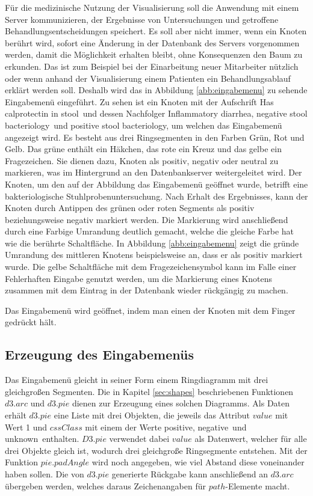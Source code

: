 Für die medizinische Nutzung der Visualisierung soll die Anwendung mit einem Server kommunizieren, der Ergebnisse von Untersuchungen und getroffene Behandlungsentscheidungen speichert. Es soll aber nicht immer, wenn ein Knoten berührt wird, sofort eine Änderung in der Datenbank des Servers vorgenommen werden, damit die Möglichkeit erhalten bleibt, ohne Konsequenzen den Baum zu erkunden. Das ist zum Beispiel bei der Einarbeitung neuer Mitarbeiter nützlich oder wenn anhand der Visualisierung einem Patienten ein Behandlungsablauf erklärt werden soll. Deshalb wird das in Abbildung \ref{abb:eingabemenu} zu sehende Eingabemenü eingeführt.  Zu sehen ist ein Knoten mit der Aufschrift \glqq Has calprotectin in stool\grqq\ und dessen Nachfolger \glqq Inflammatory diarrhea\grqq , \glqq negative stool bacteriology\grqq\ und \glqq positive stool bacteriology\grqq , um welchen das Eingabemenü angezeigt wird. Es besteht aus drei Ringsegmenten in den Farben Grün, Rot und Gelb. Das grüne enthält ein Häkchen, das rote ein Kreuz und das gelbe ein Fragezeichen. Sie dienen dazu, Knoten als positiv, negativ oder neutral zu markieren, was im Hintergrund an den Datenbankserver weitergeleitet wird. Der Knoten, um den auf der Abbildung das Eingabemenü geöffnet wurde, betrifft eine bakteriologische Stuhlprobenuntersuchung. Nach Erhalt des Ergebnisses, kann der Knoten durch Antippen des grünen oder roten Segments als positiv beziehungsweise negativ markiert werden. Die Markierung wird anschließend durch eine Farbige Umrandung deutlich gemacht, welche die gleiche Farbe hat wie die berührte Schaltfläche. In Abbildung \ref{abb:eingabemenu} zeigt die gründe Umrandung des mittleren Knotens beispielsweise an, dass er als positiv markiert wurde. Die gelbe Schaltfläche mit dem Fragezeichensymbol kann im Falle einer Fehlerhaften Eingabe genutzt werden, um die Markierung eines Knotens zusammen mit dem Eintrag in der Datenbank wieder rückgängig zu machen.

Das Eingabemenü wird geöffnet, indem man einen der Knoten mit dem Finger gedrückt hält. 

\subsection{Erzeugung des Eingabemenüs}
Das Eingabemenü gleicht in seiner Form einem Ringdiagramm mit drei gleichgroßen Segmenten. Die in Kapitel \ref{sec:shapes} beschriebenen Funktionen $d3.arc$ und $d3.pie$ dienen zur Erzeugung eines solchen Diagramms. Als Daten erhält $d3.pie$ eine Liste mit drei Objekten, die jeweils das Attribut $value$ mit Wert 1 und $cssClass$ mit einem der Werte \glqq positive\grqq , \glqq negative\grqq\ und \glqq unknown\grqq\ enthalten. $D3.pie$ verwendet dabei $value$ als Datenwert, welcher für alle drei Objekte gleich ist, wodurch drei gleichgroße Ringsegmente entstehen. Mit der Funktion $pie.padAngle$ wird noch angegeben, wie viel Abstand diese voneinander haben sollen. Die von $d3.pie$ generierte Rückgabe kann anschließend an $d3.arc$ übergeben werden, welches daraus Zeichenangaben für $path$-Elemente macht. 

